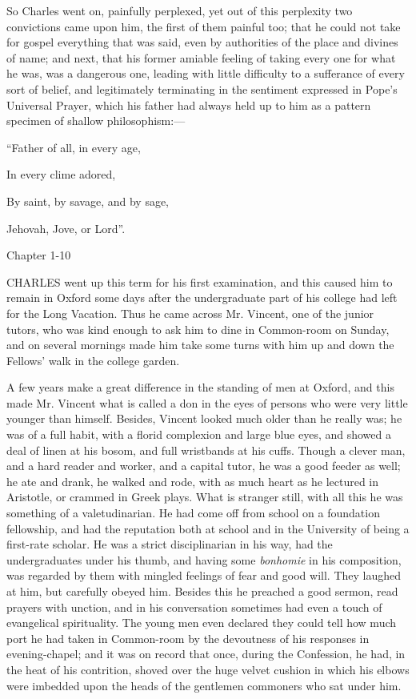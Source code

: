 So Charles went on, painfully perplexed, yet out of this perplexity
two convictions came upon him, the first of them painful too; that he
could not take for gospel everything that was said, even by
authorities of the place and divines of name; and next, that his
former amiable feeling of taking every one for what he was, was a
dangerous one, leading with little difficulty to a sufferance of every
sort of belief, and legitimately terminating in the sentiment
expressed in Pope's Universal Prayer, which his father had always held
up to him as a pattern specimen of shallow philosophism:—

``Father of all, in every age,

In every clime adored,

By saint, by savage, and by sage,

Jehovah, Jove, or Lord''.

Chapter 1-10


CHARLES went up this term for his first
examination, and this caused him to remain in Oxford some days after
the undergraduate part of his college had left for the Long Vacation.
Thus he came across Mr. Vincent, one of the junior tutors, who was
kind enough to ask him to dine in Common-room on Sunday, and on
several mornings made him take some turns with him up and down the
Fellows' walk in the college garden.

A few years make a great difference in the standing of men at
Oxford, and this made Mr. Vincent what is called a don in the eyes of
persons who were very little younger than himself. Besides, Vincent
looked much older than he really was; he was of a full habit, with a
florid complexion and large blue eyes, and showed a deal of linen at
his bosom, and full wristbands at his cuffs. Though a clever man, and
a hard reader and worker, and a capital tutor, he was a good feeder as
well; he ate and drank, he walked and rode, with as much heart as he
lectured in Aristotle, or crammed in Greek plays. What is stranger
still, with all this he was something of a valetudinarian. He had come
off from school on a foundation fellowship, and had the reputation
both at school and in the University of being a first-rate
scholar. He was a strict disciplinarian in his way, had the
undergraduates under his thumb, and having some \emph{bonhomie} in his
composition, was regarded by them with mingled feelings of fear and
good will. They laughed at him, but carefully obeyed him. Besides this
he preached a good sermon, read prayers with unction, and in his
conversation sometimes had even a touch of evangelical spirituality.
The young men even declared they could tell how much port he had taken
in Common-room by the devoutness of his responses in evening-chapel;
and it was on record that once, during the Confession, he had, in the
heat of his contrition, shoved over the huge velvet cushion in which
his elbows were imbedded upon the heads of the gentlemen commoners who
sat under him.

